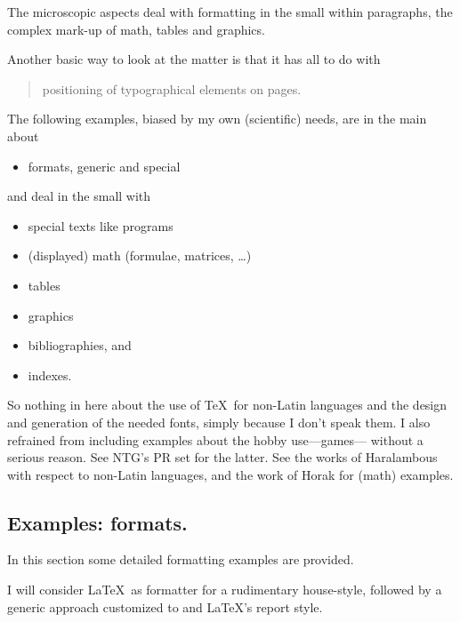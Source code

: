 The microscopic aspects deal with formatting in the small within paragraphs,
the complex mark-up of math, tables and graphics.


Another basic way to look at the matter is that it has all to do with
\begin{quote}
positioning of typographical elements on pages.
\end{quote}
\noindent The following examples,
biased by my own (scientific) needs, are in the main about
\begin{itemize}
\item formats, generic and special
\end{itemize}
\noindent and deal in the small with
\begin{itemize}
\item special texts like programs
\item (displayed) math (formulae, matrices, \ldots)
\item tables
\item graphics
\item bibliographies, and
\item indexes.
\end{itemize}
\noindent So nothing in here about the use of \TeX\ for
non-Latin languages and the design and generation of the needed fonts,
simply because I don't speak them.
I also refrained from including examples about the hobby use---games---%
without a serious reason.
See NTG's PR set for the latter.
See the works of Haralambous with respect to non-Latin languages, and
the work of Horak for (math) \MF{} examples.

\subsection{Examples: formats.}
In this section some detailed formatting examples are provided.

I will consider \LaTeX\ as formatter for a rudimentary
house-style, followed by a generic approach customized to \mm{} and \LaTeX's
report style.


